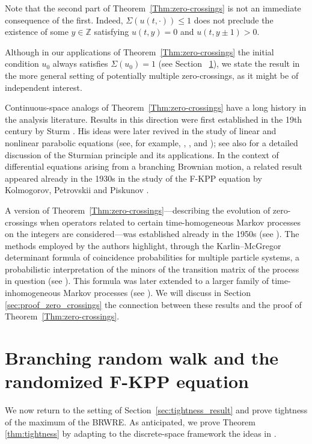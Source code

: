 \documentclass[12pt,reqno,oneside]{amsart}
\numberwithin{equation}{section}
\theoremstyle{definition}
\theoremstyle{remark}
\newcommand{\Z}{\mathbb{Z}}
\begin{document}
Note that the second part of Theorem~\ref{Thm:zero-crossings} is not an
immediate consequence of the first. Indeed, $\Sigma(u(t, \cdot)) \leq 1$ does
not preclude the existence of some $y \in \Z$ satisfying $u(t,y)=0$ and
$u(t,y \pm 1)>0$.

Although in our applications of Theorem~\ref{Thm:zero-crossings} the initial
condition $u_0$ always satisfies $\Sigma(u_0)=1$ (see Section
 ~\ref{sec:F_KPP}), we state the result in the more general setting of
potentially multiple zero-crossings, as it might be of independent interest.

Continuous-space analogs of Theorem~\ref{Thm:zero-crossings} have a long
history in the analysis literature. Results in this direction were first
established in the 19th century by Sturm \cite{Stu36}. His ideas were later
revived in the study of linear and nonlinear parabolic equations (see, for
  example, \cite{Ang88}, \cite{Ang91}, \cite{DGM14} and \cite{Nad15}); see
also \cite{Gal04} for a detailed discussion of the Sturmian principle and its
applications. In the context of differential equations arising from a
branching Brownian motion, a related result appeared already in the 1930s in the
study of the F-KPP equation by Kolmogorov, Petrovskii and Piskunov
\cite{KPP37}.

A version of Theorem~\ref{Thm:zero-crossings}---describing the evolution of
zero-crossings when operators related to certain time-homogeneous Markov
processes on the integers are considered---was established already in the
1950s (see \cite{KM57}). The methods employed by the authors highlight,
through the Karlin--McGregor determinant formula of coincidence probabilities
for multiple particle systems, a probabilistic interpretation of the minors
of the transition matrix of the process in question (see \cite{KM58}). This
formula was later extended to a larger family of time-inhomogeneous Markov
processes (see \cite{Kar88}). We will discuss in Section
\ref{sec:proof_zero_crossings} the connection between these results and the
proof of Theorem~\ref{Thm:zero-crossings}.

\section{Branching random walk and the randomized F-KPP equation}
\label{sec:F_KPP}

We now return to the setting of Section~\ref{sec:tightness_result} and prove
tightness of the maximum of the BRWRE. As anticipated, we prove Theorem
\ref{thm:tightness} by adapting to the discrete-space framework the ideas in
\cite{CDO25}.
\end{document}
